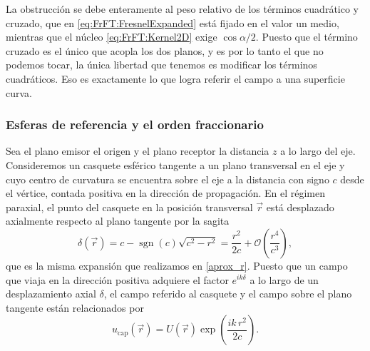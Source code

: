 			La obstrucción se debe enteramente al peso relativo de los términos cuadrático y cruzado, que en \eqref{eq:FrFT:FresnelExpanded} está fijado en el valor un medio, mientras que el núcleo \eqref{eq:FrFT:Kernel2D} exige $\cos\alpha/2$. Puesto que el término cruzado es el único que acopla los dos planos, y es por lo tanto el que no podemos tocar, la única libertad que tenemos es modificar los términos cuadráticos. Eso es exactamente lo que logra referir el campo a una superficie curva.

		\subsubsection{Esferas de referencia y el orden fraccionario}

			Sea el plano emisor el origen y el plano receptor la distancia $z$ a lo largo del eje. Consideremos un casquete esférico tangente a un plano transversal en el eje y cuyo centro de curvatura se encuentra sobre el eje a la distancia con signo $c$ desde el vértice, contada positiva en la dirección de propagación. En el régimen paraxial, el punto del casquete en la posición transversal $\vec{r}$ está desplazado axialmente respecto al plano tangente por la sagita
			\begin{equation}\label{eq:FrFT:Sagitta}
				\delta(\vec{r}) = c - \operatorname{sgn}(c)\sqrt{c^{2}-r^{2}} = \frac{r^{2}}{2c} + \mathcal{O}\!\left(\frac{r^{4}}{c^{3}}\right),
			\end{equation}
			que es la misma expansión que realizamos en \eqref{aprox_r}. Puesto que un campo que viaja en la dirección positiva adquiere el factor $e^{ik\delta}$ a lo largo de un desplazamiento axial $\delta$, el campo referido al casquete y el campo sobre el plano tangente están relacionados por
			\begin{equation}\label{eq:FrFT:SphereRule}
				u_{\text{cap}}(\vec{r}) = U(\vec{r})\exp\left(\frac{ik\,r^{2}}{2c}\right).
			\end{equation}

